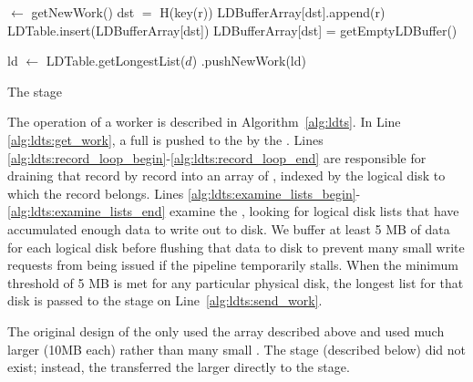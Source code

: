 \begin{algorithm}
\begin{algorithmic}[1]
\STATE \nodebuffer $\leftarrow$ getNewWork()\label{alg:ldts:get_work}
\STATE {}
\label{alg:ldts:record_loop_begin}
    \STATE dst $=$ H(key(r))
    \STATE LDBufferArray[dst].append(r)
        \STATE LDTable.insert(LDBufferArray[dst])
        \STATE LDBufferArray[dst] = getEmptyLDBuffer()
    \ENDIF
\ENDFOR\label{alg:ldts:record_loop_end}

\STATE {}
\label{alg:ldts:examine_lists_begin}
        \STATE ld $\leftarrow$ LDTable.getLongestList($d$)
        \STATE \coalescer.pushNewWork(ld)\label{alg:ldts:send_work}
    \ENDWHILE
\ENDFOR\label{alg:ldts:examine_lists_end}
\end{algorithmic}
\caption{The \ldts stage}
\label{alg:ldts}
\end{algorithm}

The operation of a \ldts worker is described in Algorithm~\ref{alg:ldts}. In
Line \ref{alg:ldts:get_work}, a full \nodebuffer is pushed to the \ldts by the
\receiver. Lines \ref{alg:ldts:record_loop_begin}-\ref{alg:ldts:record_loop_end}
are responsible for draining that \nodebuffer record by record into an array of
\ldbuffers, indexed by the logical disk to which the record belongs. Lines
\ref{alg:ldts:examine_lists_begin}-\ref{alg:ldts:examine_lists_end} examine the
\ldtable, looking for logical disk lists that have accumulated enough data to
write out to disk.  We buffer at least 5 MB of data for each logical disk
before flushing that data to disk to prevent many small write requests from
being issued if the pipeline temporarily stalls.  When the minimum threshold of
5 MB is met for any particular physical disk, the longest \ldbuffer list for
that disk is passed to the \coalescer stage on
Line~\ref{alg:ldts:send_work}.

The original design of the \ldts only used the \ldbuffer array described above
and used much larger \ldbuffers (\tilde 10MB each) rather than many small
\ldbuffers. The \coalescer stage (described below) did not exist; instead, the
\ldts transferred the larger \ldbuffers directly to the \writer stage.

